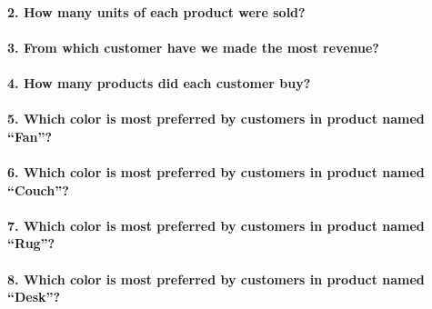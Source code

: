 \documentclass[
]{article}
\begin{document}
\hypertarget{how-many-units-of-each-product-were-sold}{%
\paragraph{2. How many units of each product were
sold?}\label{how-many-units-of-each-product-were-sold}}

\hypertarget{from-which-customer-have-we-made-the-most-revenue}{%
\paragraph{3. From which customer have we made the most
revenue?}\label{from-which-customer-have-we-made-the-most-revenue}}

\hypertarget{how-many-products-did-each-customer-buy}{%
\paragraph{4. How many products did each customer
buy?}\label{how-many-products-did-each-customer-buy}}

\hypertarget{which-color-is-most-preferred-by-customers-in-product-named-fan}{%
\paragraph{5. Which color is most preferred by customers in product
named
``Fan''?}\label{which-color-is-most-preferred-by-customers-in-product-named-fan}}

\hypertarget{which-color-is-most-preferred-by-customers-in-product-named-couch}{%
\paragraph{6. Which color is most preferred by customers in product
named
``Couch''?}\label{which-color-is-most-preferred-by-customers-in-product-named-couch}}

\hypertarget{which-color-is-most-preferred-by-customers-in-product-named-rug}{%
\paragraph{7. Which color is most preferred by customers in product
named
``Rug''?}\label{which-color-is-most-preferred-by-customers-in-product-named-rug}}

\hypertarget{which-color-is-most-preferred-by-customers-in-product-named-desk}{%
\paragraph{8. Which color is most preferred by customers in product
named
``Desk''?}\label{which-color-is-most-preferred-by-customers-in-product-named-desk}}
\end{document}
